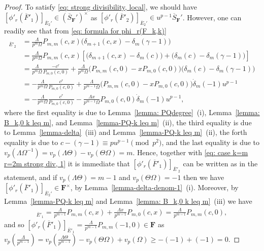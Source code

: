 \documentclass[11pt]{amsart}
\theoremstyle{definition}
\numberwithin{equation}{subsection}
\theoremstyle{plain}
\theoremstyle{plain}
\theoremstyle{plain}
\theoremstyle{plain}
\theoremstyle{plain}
\theoremstyle{plain}
\theoremstyle{plain}
\theoremstyle{plain}
\theoremstyle{plain}
\theoremstyle{plain}
\theoremstyle{plain}
\theoremstyle{plain}
\theoremstyle{definition}
\theoremstyle{definition}
\theoremstyle{definition}
\theoremstyle{remark}
\renewcommand{\(}{\textup{(}}
\renewcommand{\)}{\textup{)}}
\newcommand{\F}{\mathbf{F}}
\newcommand{\barS}{\overline{S}}
\newcommand{\barE}{\overline{E}}
\newcommand{\barF}{\overline{F}}
\begin{document}
\begin{proof}
To satisfy \eqref{eq: strong divisibility, local}, we should have $[\phi'_r(\barF'_1)]_{\barE_2'}\in (\barS_\F')^\times$ as $[\phi'_r(\barF'_2)]_{\barE_2'}\in u^{p-1}\barS_\F'$. However, one can readily see that from \eqref{eq: formula for phi_r(F_k,k)}
\begin{align*}
[\phi'_r(\barF'_{m,m})]_{\barE'_2}&=\frac{\Lambda}{p^m\Omega}  P_{m,m}(c,x)\big(\delta_{m+1}(c,x)-\delta_m(\gamma-1)\big)\\
            &=\frac{\Lambda}{p^m\Omega} P_{m,m}(c,x)\left[\big(\delta_{m+1}(c,x)-\delta_m(c)\big) +\big(\delta_m(c)-\delta_m(\gamma-1)\big)\right]\\
            &=\frac{\Lambda}{p^m\Omega} \frac{-c^r}{P_{m,0}(c,0)}
            +\frac{\Lambda}{p^m\Omega} \big(P_{m,m}(c,0)-xP_{m,0}(c,0)\big)
            \big(\delta_m(c)-\delta_m(\gamma-1)\big)\\
            &= -\frac{\Lambda}{p^m\Omega} \frac{c^r}{P_{m,0}(c,0)}
            +\frac{\Lambda}{p^{m-1}\Omega} \big(P_{m,m}(c,0)-xP_{m,0}(c,0)\big)
            \dot{\delta}_m(-1)u^{p-1}\\
            &= -\frac{\Lambda}{p^m\Omega} \frac{c^r}{P_{m,0}(c,0)} -\frac{\Lambda x}{p^{m-1}\Omega} P_{m,0}(c,0)\dot{\delta}_m(-1)u^{p-1},
\end{align*}
where the first equality is due to Lemma~\ref{lemma: PQdegree}~(i), Lemma~\ref{lemma: B_k,0 k leq m}, and Lemma~\ref{lemma-PQ-k leq m}~(ii), the third equality is due to Lemma~\ref{lemma-delta}~(iii) and Lemma~\ref{lemma-PQ-k leq m}~(ii), the forth equality is due to $c-(\gamma-1)\equiv pu^{p-1}\pmod{p^2}$, and the last equality is due to $v_p(\Lambda\Omega^{-1})=v_p(\Lambda\Theta)-v_p(\Theta\Omega)=m$. Hence, together with \eqref{eq: case k=m r=2m strong div, 1} it is immediate that $[\phi'_r(\barF'_1)]_{\barE'_2}$ can be written as in the statement, and if $v_p(\Lambda\Theta)=m-1$ and $v_p(\Theta\Omega)=-1$ then we have $[\phi'_r(\barF'_1)]_{\barE_2'}\in \F^\times$, by Lemma~\ref{lemma-delta-denom-1}~(i). Moreover, by Lemma~\ref{lemma-PQ-k leq m} and Lemma~\ref{lemma: B_k,0 k leq m}~(iii) we have
\begin{align*}
[\phi'_r(\barF'_1)]_{\barE'_1}=\frac{\Lambda }{p^{m-1}}P_{m,m}(c,x)+\frac{ \Lambda x}{p^{m-1}}P_{m,0}(c,x)=\frac{\Lambda }{p^{m-1}}P_{m,m}(c,0),
\end{align*}
and so $[\phi'_r(\barF'_1)]_{\barE'_1}=\frac{\Lambda }{p^{m-1}}P_{m,m}(-1,0)\in\F$ as $v_p(\frac{\Lambda}{p^{m-1}})=v_p(\frac{\Lambda\Theta}{p^{m-1}})-v_p(\Theta\Omega)+v_p(\Omega)\geq -(-1)+(-1)=0$.





\end{proof}
\end{document}
